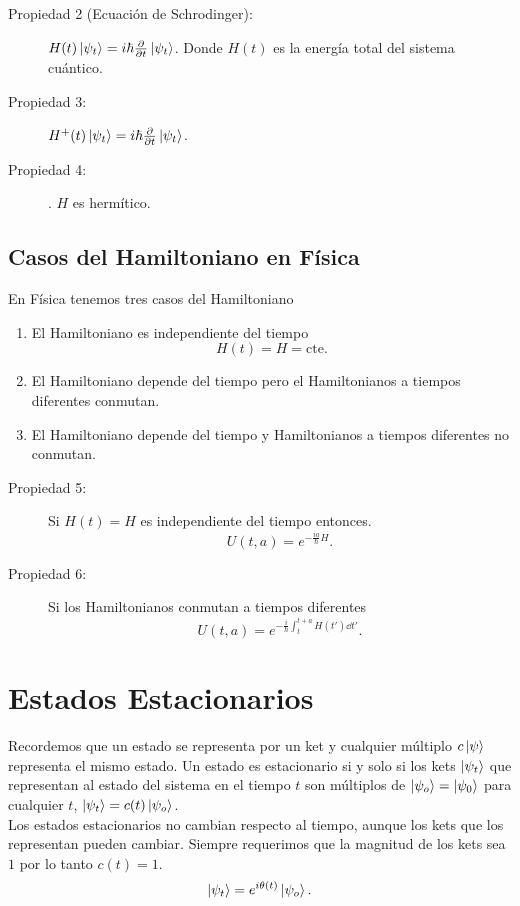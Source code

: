 \begin{description}
	\item[Propiedad 2 (Ecuación de Schrodinger): ] $H(t) \ket{\psi_{t} } = i\hbar \pdv{t} \ket{\psi_{t} }$. Donde $H(t)$ es la energía total del sistema cuántico.
	\item[Propiedad 3: ] $H^+ (t) \ket{\psi_{t} } = i\hbar \pdv{t} \ket{\psi_{t} }$.
	\item[Propiedad 4: ] . $H$ es hermítico.
	 
\end{description}


\subsection{Casos del Hamiltoniano en Física}
En Física tenemos tres casos del Hamiltoniano
\begin{enumerate}
	\item El Hamiltoniano es independiente del tiempo
		$$ H(t) = H = \text{cte}. $$
	\item El Hamiltoniano depende del tiempo pero el Hamiltonianos a tiempos diferentes conmutan.
	\item El Hamiltoniano depende del tiempo y Hamiltonianos a tiempos diferentes no conmutan.
\end{enumerate}



\begin{description}
	\item[Propiedad 5: ] Si $H(t) = H$ es independiente del tiempo entonces.
		$$ U(t,a) = e^{-\frac{ia}{\hbar} H}. $$ 
	\item[Propiedad 6: ] Si los Hamiltonianos conmutan a tiempos diferentes
		$$ U(t,a) = e^{-\frac{i}{\hbar} \int _t ^{t+a} H(t') \dd{t'}}. $$
\end{description}


\section{Estados Estacionarios}
Recordemos que un estado se representa por un ket y cualquier múltiplo $c\ket{\psi}$ representa el mismo estado. Un estado es estacionario si y solo si los kets $\ket{\psi_{t} }$ que representan al estado del sistema en el tiempo $t$ son múltiplos de $\ket{\psi _o} = \ket{\psi_{0} }$ para cualquier $t$, $\ket{\psi_{t} } = c(t) \ket{\psi _o}$. \\

Los estados estacionarios no cambian respecto al tiempo, aunque los kets que los representan pueden cambiar. Siempre requerimos que la magnitud de los kets sea $1$ por lo tanto $c(t) = 1$. 
	$$ \ket{\psi_{t} } = e^{i\theta (t)} \ket{\psi _o}. $$


